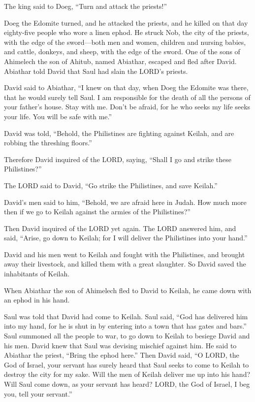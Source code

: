 \myverse{}The king said to Doeg, “Turn and attack the priests!”

Doeg the Edomite turned, and he attacked the priests, and he killed on that day eighty-five
people who wore a linen ephod.
\myverse{}He struck Nob, the city of the priests, with the edge of the sword—both men
and women, children and nursing babies, and cattle, donkeys, and sheep, with the edge of the sword.
\myverse{}One of the sons of Ahimelech the son of Ahitub, named Abiathar, escaped and
fled after David.
\myverse{}Abiathar told David that Saul had slain the LORD’s priests.

\myverse{}David said to Abiathar, “I knew on that day, when Doeg the Edomite
was there, that he would surely tell Saul. I am responsible for the death of all the persons of your father’s
house.
\myverse{}Stay with me. Don’t be afraid, for he who seeks my life seeks your life.
You will be safe with me.”


\mychapter{} \myverse*{}David was told, “Behold, the Philistines are fighting against
Keilah, and are robbing the threshing floors.”

\quad \myverse{}Therefore David inquired of the LORD, saying, “Shall I go and
strike these Philistines?”

The LORD said to David, “Go strike the Philistines, and save Keilah.”

\myverse{}David’s men said to him, “Behold, we are afraid here in Judah.
How much more then if we go to Keilah against the armies of the Philistines?”

\myverse{}Then David inquired of the LORD yet again. The LORD answered him,
and said, “Arise, go down to Keilah; for I will deliver the Philistines into your hand.”

\myverse{}David and his men went to Keilah and fought with the Philistines,
and brought away their livestock, and killed them with a great slaughter. So David saved the inhabitants
of Keilah.

\myverse{}When Abiathar the son of Ahimelech fled to David to Keilah, he
came down with an ephod in his hand.

\myverse{}Saul was told that David had come to Keilah. Saul said, “God has
delivered him into my hand, for he is shut in by entering into a town that has gates and bars.”
\myverse{}Saul summoned all the people to war, to go down to Keilah to besiege David
and his men.
\myverse{}David knew that Saul was devising mischief against him. He said to Abiathar
the priest, “Bring the ephod here.”
\myverse{}Then David said, “O LORD, the God of Israel, your servant has surely heard
that Saul seeks to come to Keilah to destroy the city for my sake.
\myverse{}Will the men of Keilah deliver me up into his hand? Will Saul come down,
as your servant has heard? LORD, the God of Israel, I beg you, tell your servant.”

